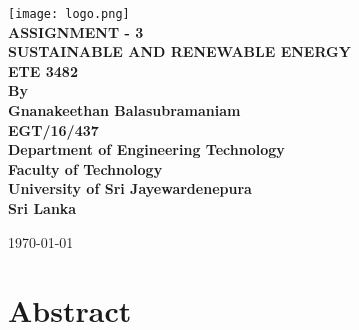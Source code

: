 \documentclass[12pt,a4paper]{article}
\renewcommand{\baselinestretch}{1.5}
\begin{document}
\begin{titlepage}


\begin{flushright}
\end{flushright}


\center %
{
\texttt{[image: logo.png]}\\[0.5cm]
\fontsize{24pt}{30}\selectfont \textbf{\uppercase{Assignment - 3}}\\[1.5cm]
\fontsize{16}{24}\selectfont \textbf{\uppercase{Sustainable and Renewable Energy}}\\[1.5cm]
\fontsize{16pt}{24}\selectfont \textbf{ETE 3482}\\[0.75cm]
\fontsize{16pt}{24}\selectfont \textbf{By}\\[0.5cm]
\fontsize{12pt}{12}\selectfont \textbf { Gnanakeethan Balasubramaniam \\ EGT/16/437}\\[0.5cm]

\vspace*{\fill}
\fontsize{12pt}{12}\selectfont \textbf {Department of Engineering Technology \\ Faculty of Technology\\University of Sri Jayewardenepura\\ Sri Lanka \\ }
\vspace*{\fill}

\today
}



\end{titlepage}


\section{Abstract}

\newpage 
\renewcommand{\baselinestretch}{1}\normalsize
\tableofcontents
\renewcommand{\baselinestretch}{1.5}\normalsize
\end{document}
